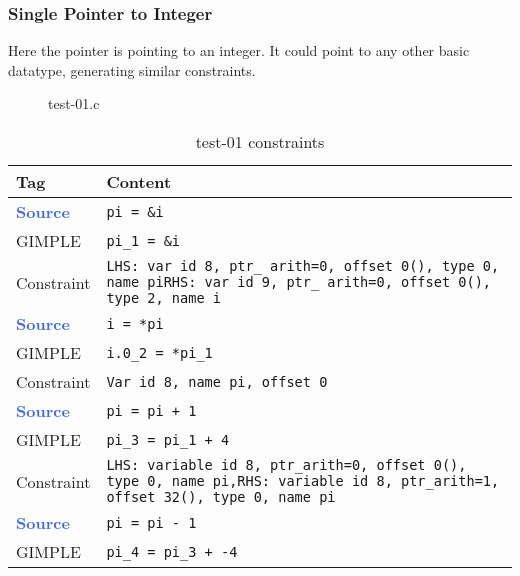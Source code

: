 \subsubsection{Single Pointer to Integer} Here the pointer is pointing to an integer. It could point to any other basic datatype, generating similar constraints.

\begin{figure}
\label{fig:test-01}

\caption{test-01.c}
\end{figure}

    \begin{center}
        \begin{longtable}{| m{10ex} | m{75ex} |}

\caption{test-01 constraints\label{table:test-01-constr}} \\
            \hline
            \textbf{Tag} & \textbf{Content} \\
            \hline
            \hline
            \textcolor{RoyalBlue}{\textbf{Source}} & \texttt{pi = \&i} \\ \hline
            GIMPLE & \texttt{pi\_1 = \&i} \\ \hline
            Constraint & \texttt{LHS: var id 8, ptr\_ arith=0, offset 0(), type 0, name pi\newline RHS: var id 9, ptr\_ arith=0, offset 0(), type 2, name i} \\
            \hline 
            \hline
            \textcolor{RoyalBlue}{\textbf{Source}} & \texttt{i = *pi} \\ \hline
            GIMPLE & \texttt{i.0\_2 = *pi\_1} \\ \hline
            Constraint & \texttt{Var id 8, name pi, offset 0} \\
            \hline
            \hline
            \textcolor{RoyalBlue}{\textbf{Source}} & \texttt{pi = pi + 1} \\ \hline
            GIMPLE & \texttt{pi\_3 = pi\_1 + 4} \\ \hline
            Constraint & \texttt{LHS: variable id 8, ptr\_arith=0, offset 0(), type 0, name pi,\newline RHS: variable id 8, ptr\_arith=1, offset 32(), type 0, name pi} \\
            \hline
            \hline
            \textcolor{RoyalBlue}{\textbf{Source}} & \texttt{pi = pi - 1} \\ \hline
            GIMPLE & \texttt{pi\_4 = pi\_3 + -4} \\ \hline

\end{longtable}
\end{center}
